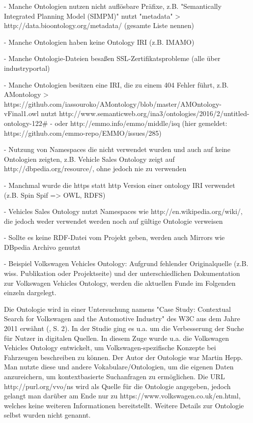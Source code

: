 \documentclass{article}
\begin{document}
- Manche Ontologien nutzen nicht auflösbare Präfixe, z.B. "Semantically Integrated Planning Model (SIMPM)" nutzt "metadata" > http://data.bioontology.org/metadata/ (gesamte Liste nennen)

- Manche Ontologien haben keine Ontology IRI (z.B. IMAMO)

- Manche Ontologie-Dateien besaßen SSL-Zertifikatsprobleme (alle über industryportal)

- Manche Ontologien besitzen eine IRI, die zu einem 404 Fehler führt, z.B. AMontology > https://github.com/iassouroko/AMontology/blob/master/AMOntology-vFinal1.owl nutzt http://www.semanticweb.org/ina3/ontologies/2016/2/untitled-ontology-122\#
  - oder http://emmo.info/emmo/middle/isq (hier gemeldet: https://github.com/emmo-repo/EMMO/issues/285)

- Nutzung von Namespaces die nicht verwendet wurden und auch auf keine Ontologien zeigten, z.B. Vehicle Sales Ontology zeigt auf http://dbpedia.org/resource/, ohne jedoch nie zu verwenden

- Manchmal wurde die https statt http Version einer ontology IRI verwendet (z.B. Spin Spif => OWL, RDFS)

- Vehicles Sales Ontology nutzt Namespaces wie http://en.wikipedia.org/wiki/, die jedoch weder verwendet werden noch auf gültige Ontologie verweisen

- Sollte es keine RDF-Datei vom Projekt geben, werden auch Mirrors wie DBpedia Archivo genutzt

%

  - Beispiel Volkswagen Vehicles Ontology: Aufgrund fehlender Originalquelle (z.B. wiss. Publikation oder Projektseite) und der unterschiedlichen Dokumentation zur Volkswagen Vehicles Ontology, werden die aktuellen Funde im Folgenden einzeln dargelegt.

Die Ontologie wird in einer Untersuchung namens "Case Study: Contextual Search for Volkswagen and the Automotive Industry" des W3C aus dem Jahre 2011 erwähnt (\cite{greenly2011case}, S. 2).
In der Studie ging es u.a. um die Verbesserung der Suche für Nutzer in digitalen Quellen.
In diesem Zuge wurde u.a. die Volkswagen Vehicles Ontology entwickelt, um Volkswagen-spezifische Konzepte bei Fahrzeugen beschreiben zu können.
Der Autor der Ontologie war Martin Hepp.
Man nutzte diese und andere Vokabulare/Ontologien, um die eigenen Daten anzureichern, um kontextbasierte Suchanfragen zu ermöglichen.
Die URL http://purl.org/vvo/ns wird als Quelle für die Ontologie angegeben, jedoch gelangt man darüber am Ende nur zu https://www.volkswagen.co.uk/en.html, welches keine weiteren Informationen bereitstellt.
Weitere Details zur Ontologie selbst wurden nicht genannt.
\end{document}
